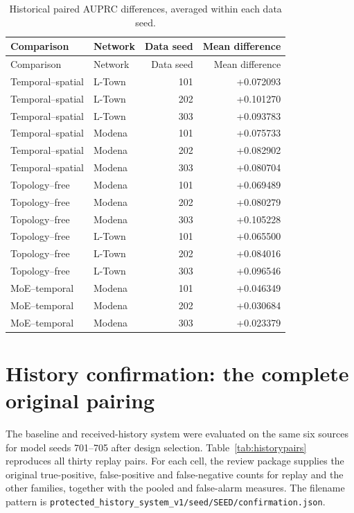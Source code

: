 \begin{longtable}{@{}llrr@{}}
\caption[Data-seed means of historical effects]{Historical paired AUPRC differences, averaged within each data seed.}\label{tab:seedcontrasts}\\
\toprule Comparison & Network & Data seed & Mean difference\\\midrule\endfirsthead
\toprule Comparison & Network & Data seed & Mean difference\\\midrule\endhead
Temporal--spatial & L-Town & 101 & +0.072093\\
Temporal--spatial & L-Town & 202 & +0.101270\\
Temporal--spatial & L-Town & 303 & +0.093783\\
Temporal--spatial & Modena & 101 & +0.075733\\
Temporal--spatial & Modena & 202 & +0.082902\\
Temporal--spatial & Modena & 303 & +0.080704\\
Topology--free & Modena & 101 & +0.069489\\
Topology--free & Modena & 202 & +0.080279\\
Topology--free & Modena & 303 & +0.105228\\
Topology--free & L-Town & 101 & +0.065500\\
Topology--free & L-Town & 202 & +0.084016\\
Topology--free & L-Town & 303 & +0.096546\\
MoE--temporal & Modena & 101 & +0.046349\\
MoE--temporal & Modena & 202 & +0.030684\\
MoE--temporal & Modena & 303 & +0.023379\\
\bottomrule\end{longtable}

\section{History confirmation: the complete original pairing}
The baseline and received-history system were evaluated on the same six sources for model seeds 701--705 after design selection. Table~\ref{tab:historypairs} reproduces all thirty replay pairs. For each cell, the review package supplies the original true-positive, false-positive and false-negative counts for replay and the other families, together with the pooled and false-alarm measures. The filename pattern is \texttt{protected\_history\_system\_v1/seed/SEED/confirmation.json}.

